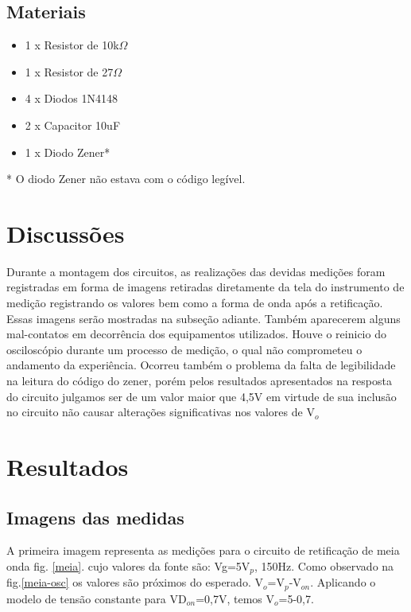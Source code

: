 \subsection{Materiais}

\begin{itemize}
\item 1 x Resistor de 10k$\Omega$
\item 1 x Resistor de 27$\Omega$
\item 4 x Diodos 1N4148
\item 2 x Capacitor 10uF
\item 1 x Diodo Zener*
\end{itemize}

* O diodo Zener não estava com o código legível. 


\section{Discussões}
 Durante a montagem dos circuitos, as realizações das devidas medições foram registradas em forma de imagens retiradas diretamente da tela do instrumento de medição registrando os valores bem como a forma de onda após a retificação. Essas imagens serão mostradas na subseção adiante.
 Também aparecerem alguns mal-contatos em decorrência dos equipamentos utilizados.
 Houve o reinicio do osciloscópio durante um processo de medição, o qual não comprometeu o andamento da experiência.
 Ocorreu também o problema da falta de legibilidade na leitura do código do zener, porém pelos resultados apresentados na resposta do circuito julgamos ser de um valor maior que 4,5V em virtude de sua inclusão no circuito não causar alterações significativas nos valores de V$_o$

\section{Resultados}
\subsection{Imagens das medidas}

 A primeira imagem representa as medições para o circuito de retificação de meia onda fig. \ref{meia}. cujo valores da fonte são: Vg=5V$_p$, 150Hz.
Como observado na fig.\ref{meia-osc} os valores são próximos do esperado. V$_o$=V$_p$-V$_{on}$. Aplicando o modelo de tensão constante para VD$_{on}$=0,7V, temos V$_{o}$=5-0,7. 

